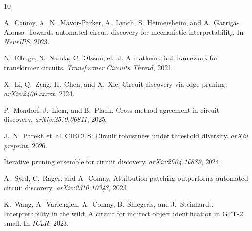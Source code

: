 \documentclass[11pt,a4paper]{article}
\begin{document}
\begin{thebibliography}{10}

A.~Conmy, A.~N.~Mavor-Parker, A.~Lynch, S.~Heimersheim, and A.~Garriga-Alonso.
Towards automated circuit discovery for mechanistic interpretability.
In \emph{NeurIPS}, 2023.

N.~Elhage, N.~Nanda, C.~Olsson, et~al.
A mathematical framework for transformer circuits.
\emph{Transformer Circuits Thread}, 2021.

X.~Li, Q.~Zeng, H.~Chen, and X.~Xie.
Circuit discovery via edge pruning.
\emph{arXiv:2406.xxxxx}, 2024.

P.~Mondorf, J.~Liem, and B.~Plank.
Cross-method agreement in circuit discovery.
\emph{arXiv:2510.06811}, 2025.

J.~N.~Parekh et~al.
CIRCUS: Circuit robustness under threshold diversity.
\emph{arXiv preprint}, 2026.

Iterative pruning ensemble for circuit discovery.
\emph{arXiv:2604.16889}, 2024.

A.~Syed, C.~Rager, and A.~Conmy.
Attribution patching outperforms automated circuit discovery.
\emph{arXiv:2310.10348}, 2023.

K.~Wang, A.~Variengien, A.~Conmy, B.~Shlegeris, and J.~Steinhardt.
Interpretability in the wild: A circuit for indirect object identification in GPT-2 small.
In \emph{ICLR}, 2023.

\end{thebibliography}
\end{document}
